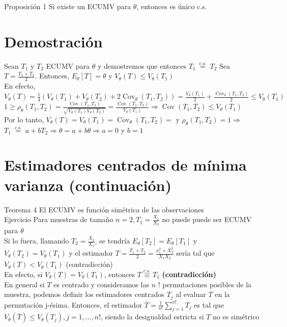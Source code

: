 Proposición 1 Si existe un ECUMV para $\theta$, entonces es único c.s.

\section*{Demostración}
Sean $T_{1}$ y $T_{2}$ ECUMV para $\theta$ y demostremos que entonces $T_{1} \stackrel{\text { c.s. }}{=} T_{2}$ Sea $T=\frac{T_{1}+T_{2}}{2}$. Entonces, $E_{\theta}[T]=\theta$ y $V_{\theta}(T) \leq V_{\theta}\left(T_{1}\right)$\\
En efecto, $V_{\theta}(T)=\frac{1}{4}\left(V_{\theta}\left(T_{1}\right)+V_{\theta}\left(T_{2}\right)+2 \operatorname{Cov}_{\theta}\left(T_{1}, T_{2}\right)\right)=\frac{V_{\theta}\left(T_{1}\right)}{2}+\frac{\operatorname{Cov}_{\theta}\left(T_{1}, T_{2}\right)}{2} \leq V_{\theta}\left(T_{1}\right)$\\
$1 \geq \rho_{\theta}\left(T_{1}, T_{2}\right)=\frac{\operatorname{Cov}\left(T_{1}, T_{2}\right)}{\sqrt{V_{\theta}\left(T_{1}\right) V_{\theta}\left(T_{2}\right)}}=\frac{\operatorname{Cov}\left(T_{1}, T_{2}\right)}{V_{\theta}\left(T_{1}\right)} \Rightarrow \operatorname{Cov}\left(T_{1}, T_{2}\right) \leq V_{\theta}\left(T_{1}\right)$\\
Por lo tanto, $V_{\theta}(T)=V_{\theta}\left(T_{1}\right)=\operatorname{Cov}_{\theta}\left(T_{1}, T_{2}\right)=$ y $\rho_{\theta}\left(T_{1}, T_{2}\right)=1 \Rightarrow$ $T_{1} \stackrel{\text { c.s. }}{=} a+b T_{2} \Rightarrow \theta=a+b \theta \Rightarrow a=0$ y $b=1$

\section*{Estimadores centrados de mínima varianza (continuación)}
Teorema 4 El ECUMV es función simétrica de las observaciones\\
Ejercicio Para muestras de tamaño $n=2, T_{1}=\frac{X_{1}}{X_{2}}$ no puede puede ser ECUMV para $\theta$\\
Si lo fuera, llamando $T_{2}=\frac{X_{2}}{X_{1}}$, se tendría $E_{\theta}\left[T_{2}\right]=E_{\theta}\left[T_{1}\right]$ y\\
$V_{\theta}\left(T_{2}\right)=V_{\theta}\left(T_{1}\right)$ y el estimador $T=\frac{T_{1}+T_{2}}{2}=\frac{x_{1}^{2}+X_{2}^{2}}{X_{1} X_{2}}$ sería tal que $V_{\theta}(T)<V_{\theta}\left(T_{1}\right)$ (contradicción)\\
En efecto, si \( V_{\theta}(T) = V_{\theta}(T_1) \), entonces \( T \overset{c.s.}{\equiv} T_1 \) \textbf{(contradicción)}\\
En general si $T$ es centrado y consideramos las $n$ ! permutaciones posibles de la muestra, podemos definir los estimadores centrados $T_{j}$ al evaluar $T$ en la permutación j-ésima. Entonces, el estimador $\bar{T}=\frac{1}{n!} \sum_{j=1}^{n!} T_{j}$ es tal que $V_{\theta}(\bar{T}) \leq V_{\theta}\left(T_{j}\right), j=1, \ldots, n!$, siendo la desigualdad estricta si $T$ no es simétrico

